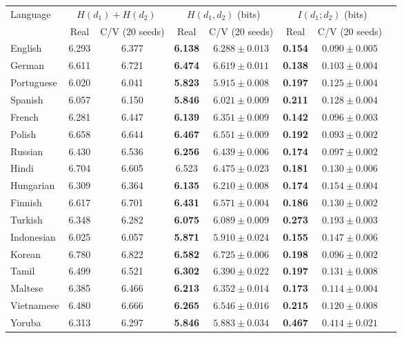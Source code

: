 \documentclass{interact}
\begin{document}
\begin{table}[htbp]
{\begin{tabular}{lccccccc}
\toprule
Language & \multicolumn{2}{c}{$H(d_1)+H(d_2)$} & \multicolumn{2}{c}{$H(d_1, d_2)$ (bits)} & \multicolumn{2}{c}{$I(d_1; d_2)$ (bits)} \\
\cmidrule(lr){2-3} \cmidrule(lr){4-5} \cmidrule(lr){6-7}
 & Real & C/V (20 seeds) & Real & C/V (20 seeds) & Real & C/V (20 seeds) \\
\midrule
English    & 6.293 & 6.377 & \textbf{6.138} & $6.288 \pm 0.013$ & \textbf{0.154} & $0.090 \pm 0.005$ \\
German     & 6.611 & 6.721 & \textbf{6.474} & $6.619 \pm 0.011$ & \textbf{0.138} & $0.103 \pm 0.004$ \\
Portuguese & 6.020 & 6.041 & \textbf{5.823} & $5.915 \pm 0.008$ & \textbf{0.197} & $0.125 \pm 0.004$ \\
Spanish    & 6.057 & 6.150 & \textbf{5.846} & $6.021 \pm 0.009$ & \textbf{0.211} & $0.128 \pm 0.004$ \\
French     & 6.281 & 6.447 & \textbf{6.139} & $6.351 \pm 0.009$ & \textbf{0.142} & $0.096 \pm 0.003$ \\
Polish     & 6.658 & 6.644 & \textbf{6.467} & $6.551 \pm 0.009$ & \textbf{0.192} & $0.093 \pm 0.002$ \\
Russian    & 6.430 & 6.536 & \textbf{6.256} & $6.439 \pm 0.006$ & \textbf{0.174} & $0.097 \pm 0.002$ \\
Hindi      & 6.704 & 6.605 & 6.523 & $\mathbf{6.475 \pm 0.023}$ & \textbf{0.181} & $0.130 \pm 0.006$ \\
Hungarian  & 6.309 & 6.364 & \textbf{6.135} & $6.210 \pm 0.008$ & \textbf{0.174} & $0.154 \pm 0.004$ \\
Finnish    & 6.617 & 6.701 & \textbf{6.431} & $6.571 \pm 0.004$ & \textbf{0.186} & $0.130 \pm 0.002$ \\
Turkish    & 6.348 & 6.282 & \textbf{6.075} & $6.089 \pm 0.009$ & \textbf{0.273} & $0.193 \pm 0.003$ \\
Indonesian & 6.025 & 6.057 & \textbf{5.871} & $5.910 \pm 0.024$ & \textbf{0.155} & $0.147 \pm 0.006$ \\
Korean     & 6.780 & 6.822 & \textbf{6.582} & $6.725 \pm 0.006$ & \textbf{0.198} & $0.096 \pm 0.002$ \\
Tamil      & 6.499 & 6.521 & \textbf{6.302} & $6.390 \pm 0.022$ & \textbf{0.197} & $0.131 \pm 0.008$ \\
Maltese    & 6.385 & 6.466 & \textbf{6.213} & $6.352 \pm 0.014$ & \textbf{0.173} & $0.114 \pm 0.004$ \\
Vietnamese & 6.480 & 6.666 & \textbf{6.265} & $6.546 \pm 0.016$ & \textbf{0.215} & $0.120 \pm 0.008$ \\
Yoruba     & 6.313 & 6.297 & \textbf{5.846} & $5.883 \pm 0.034$ & \textbf{0.467} & $0.414 \pm 0.021$ \\
\bottomrule
\end{tabular}}
\label{tab:cv_decomp}
\end{table}
\end{document}
